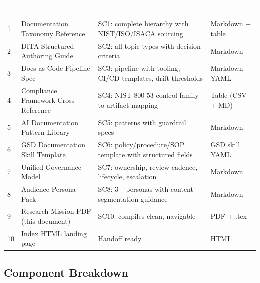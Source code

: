 \documentclass[11pt,letterpaper]{article}
\newcommand{\tableheader}[1]{\textbf{\sffamily\textcolor{white}{#1}}}
\begin{document}
\begin{center}
\begin{tabularx}{\textwidth}{C{0.5cm}L{4cm}XL{3cm}}
\toprule
{}
\tableheader{\#} & \tableheader{Deliverable} & \tableheader{Success Criteria} & \tableheader{Format} \\
 & Documentation Taxonomy Reference & SC1: complete hierarchy with NIST/ISO/ISACA sourcing & Markdown + table \\
2 & DITA Structured Authoring Guide & SC2: all topic types with decision criteria & Markdown \\
3 & Docs-as-Code Pipeline Spec & SC3: pipeline with tooling, CI/CD templates, drift thresholds & Markdown + YAML \\
4 & Compliance Framework Cross-Reference & SC4: NIST 800-53 control family to artifact mapping & Table (CSV + MD) \\
5 & AI Documentation Pattern Library & SC5: patterns with guardrail specs & Markdown \\
6 & GSD Documentation Skill Template & SC6: policy/procedure/SOP template with structured fields & GSD skill YAML \\
7 & Unified Governance Model & SC7: ownership, review cadence, lifecycle, escalation & Markdown \\
8 & Audience Persona Pack & SC8: 3+ personas with content segmentation guidance & Markdown \\
9 & Research Mission PDF (this document) & SC10: compiles clean, navigable & PDF + .tex \\
10 & Index HTML landing page & Handoff ready & HTML \\
\bottomrule
\end{tabularx}
\end{center}

\subsection{Component Breakdown}
\end{document}
